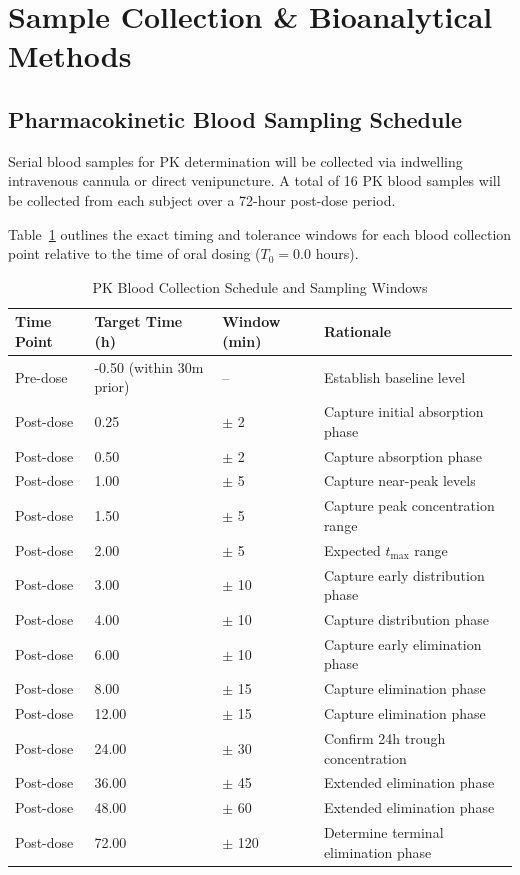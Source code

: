 \section{Sample Collection \& Bioanalytical Methods}
\label{sec:sampling}

\subsection{Pharmacokinetic Blood Sampling Schedule}

Serial blood samples for PK determination will be collected via indwelling intravenous cannula or direct venipuncture. A total of 16 PK blood samples will be collected from each subject over a 72-hour post-dose period. 

Table~\ref{tab:pk_schedule} outlines the exact timing and tolerance windows for each blood collection point relative to the time of oral dosing ($T_0 = 0.0$ hours).

\begin{table}[H]
\centering
\small
\caption{PK Blood Collection Schedule and Sampling Windows}
\label{tab:pk_schedule}
\begin{tabularx}{\textwidth}{@{}l l l X@{}}
\toprule
\textbf{Time Point} & \textbf{Target Time (h)} & \textbf{Window (min)} & \textbf{Rationale} \\
\midrule
Pre-dose & -0.50 (within 30m prior) & -- & Establish baseline level \\
Post-dose & 0.25 & $\pm$ 2 & Capture initial absorption phase \\
Post-dose & 0.50 & $\pm$ 2 & Capture absorption phase \\
Post-dose & 1.00 & $\pm$ 5 & Capture near-peak levels \\
Post-dose & 1.50 & $\pm$ 5 & Capture peak concentration range \\
Post-dose & 2.00 & $\pm$ 5 & Expected $t_{\max}$ range \\
Post-dose & 3.00 & $\pm$ 10 & Capture early distribution phase \\
Post-dose & 4.00 & $\pm$ 10 & Capture distribution phase \\
Post-dose & 6.00 & $\pm$ 10 & Capture early elimination phase \\
Post-dose & 8.00 & $\pm$ 15 & Capture elimination phase \\
Post-dose & 12.00 & $\pm$ 15 & Capture elimination phase \\
Post-dose & 24.00 & $\pm$ 30 & Confirm 24h trough concentration \\
Post-dose & 36.00 & $\pm$ 45 & Extended elimination phase \\
Post-dose & 48.00 & $\pm$ 60 & Extended elimination phase \\
Post-dose & 72.00 & $\pm$ 120 & Determine terminal elimination phase \\
\bottomrule
\end{tabularx}
\end{table}

